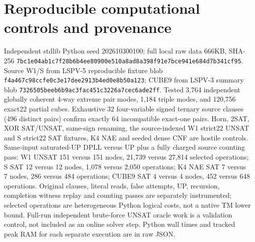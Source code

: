\documentclass[10pt]{article}
\begin{document}
\section{Reproducible computational controls and provenance}
Independent stdlib Python seed 202610300100; full local raw data 666KB, SHA-256 \texttt{7bc1e04ab1c7f28b6b4ee80900e510a8ad8a398f91e7bce941e684d7b341cf95}. Source W1/S from LSPV-5 reproducible fixture blob \texttt{f4a467c98ccfe0c3e17dee2913b4ed0e8b50a123}; CUBE9 from LSPV-3 summary blob \texttt{7326505beeb6b9ac3fac451c3226a7cec6ade2ff}. Tested 3,764 independent globally coherent 4-way extreme pair modes, 1,184 triple modes, and 120,756 exact22 partial cubes. Exhaustive 32 four-variable signed ternary source clauses (496 distinct pairs) confirm exactly 64 incompatible exact-one pairs. Horn, 2SAT, XOR SAT/UNSAT, same-sign renaming, the source-indexed W1 strict22 UNSAT and S strict22 SAT fixtures, K4 NAE and seeded dense CNF are hostile controls.
Same-input saturated-UP DPLL versus UP plus a fully charged source counting pass: W1 UNSAT 151 versus 151 nodes, 21,739 versus 27,814 selected operations; S SAT 12 versus 12 nodes, 1,078 versus 2,050 operations; K4 NAE SAT 7 versus 7 nodes, 286 versus 484 operations; CUBE9 SAT 4 versus 4 nodes, 452 versus 648 operations. Original clauses, literal reads, false attempts, UP, recursion, completion witness replay and counting passes are separately instrumented; selected operations are heterogeneous Python logical costs, not a native TM lower bound. Full-run independent brute-force UNSAT oracle work is a validation control, not included as an online solver step. Python wall times and tracked peak RAM for each separate execution are in raw JSON.
\end{document}
